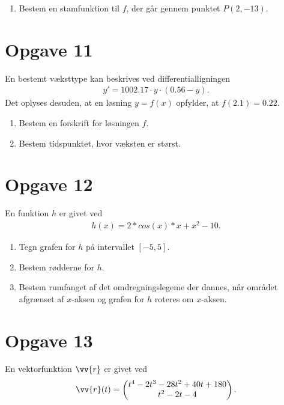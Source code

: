 \begin{enumerate}[label=\roman*)]
	\item Bestem en stamfunktion til $f$, der går gennem punktet $P(2,-13)$. 
\end{enumerate}

\section*{Opgave 11}

En bestemt væksttype kan beskrives ved differentialligningen
\begin{align*}
	y' = 1002.17\cdot y \cdot (0.56-y).
\end{align*}
Det oplyses desuden, at en løsning $y=f(x)$ opfylder, at $f(2.1) = 0.22$.

\begin{enumerate}[label=\roman*)]
	\item Bestem en forskrift for løsningen $f$.
	\item Bestem tidspunktet, hvor væksten er størst. 
\end{enumerate}

\section*{Opgave 12}

En funktion $h$ er givet ved
\begin{align*}
	h(x) = 2*cos(x)*x + x^2 - 10.
\end{align*}
\begin{enumerate}[label=\roman*)]
	\item Tegn grafen for $h$ på intervallet $[-5,5]$. 
	\item Bestem rødderne for $h$. 
	\item Bestem rumfanget af det omdregningslegeme der dannes, når området afgrænset af $x$-aksen og grafen for $h$ roteres om $x$-aksen.
\end{enumerate}

\section*{Opgave 13}

En vektorfunktion $\vv{r}$ er givet ved
\begin{align*}
	\vv{r}(t) = 
	\begin{pmatrix}
		t^4 - 2t^3 - 28t^2 + 40t + 180\\
		t^2 - 2t - 4
	\end{pmatrix}.
\end{align*}

